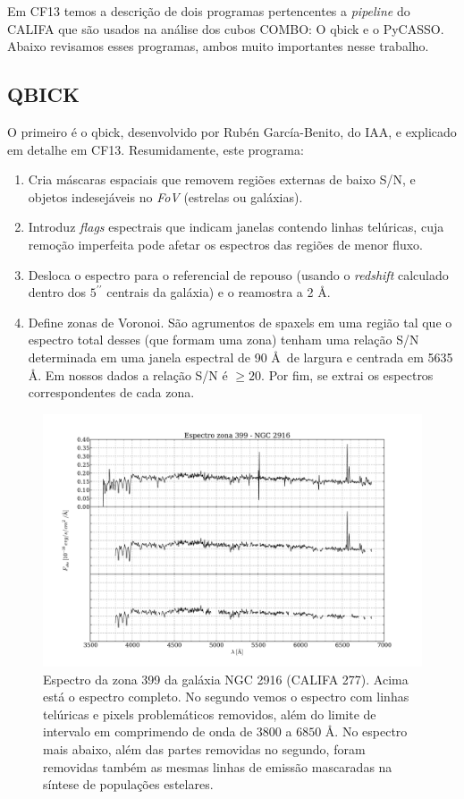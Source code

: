 Em CF13 temos a descrição de dois programas pertencentes a {\em pipeline} do CALIFA que são usados na análise dos cubos
COMBO: O {\sc qbick} e o PyCASSO. Abaixo revisamos esses programas, ambos muito importantes nesse trabalho.

\subsection{QBICK}

O primeiro é o {\sc qbick}, desenvolvido por Rubén García-Benito, do IAA, e explicado em detalhe em CF13. Resumidamente,
este programa:

\begin{enumerate}
\item Cria máscaras espaciais que removem regiões externas de baixo S/N, e objetos indesejáveis no {\em FoV} (estrelas
ou galáxias).
\item Introduz {\em flags} espectrais que indicam janelas contendo linhas telúricas, cuja remoção imperfeita pode afetar
os espectros das regiões de menor fluxo.
\item Desloca o espectro para o referencial de repouso (usando o {\em redshift} calculado dentro dos $5^{\prime\prime}$
centrais da galáxia) e o reamostra a 2 \AA.
\item Define zonas de Voronoi. São agrumentos de spaxels em uma região tal que o espectro total desses (que formam uma
zona) tenham uma relação S/N determinada em uma janela espectral de 90 \AA\ de largura e centrada em 5635 \AA. Em nossos
dados a relação S/N é $\ge 20$. Por fim, se extrai os espectros correspondentes de cada zona.
\end{enumerate}

\begin{figure}
    \includegraphics[width=1.0\textwidth]{figuras/K0277-constant_inital_mask-399.pdf}
    \caption[Exemplo de máscaras em um espectro do cubo de dados.]
    {Espectro da zona 399 da galáxia NGC 2916 (CALIFA 277). Acima está o espectro completo. No segundo vemos o espectro
    com linhas telúricas e pixels problemáticos removidos, além do limite de intervalo em comprimendo de onda de $3800$
    a $6850$ \AA. No espectro mais abaixo, além das partes removidas no segundo, foram removidas também as mesmas linhas
    de emissão mascaradas na síntese de populações estelares.}
    \label{fig:checkmask}
\end{figure}

